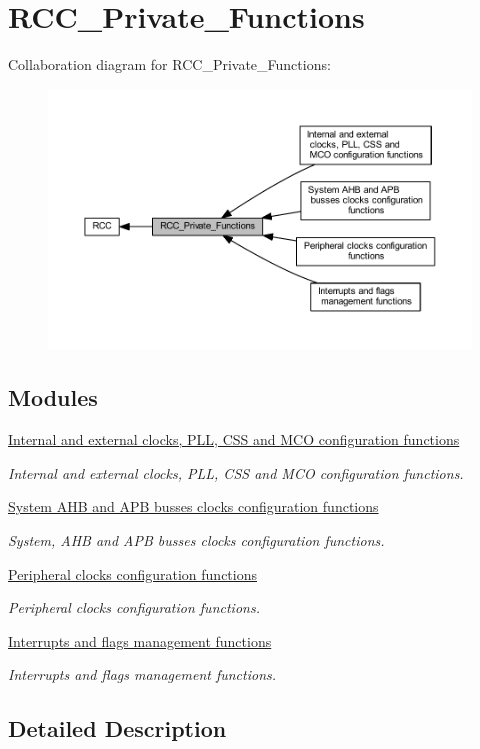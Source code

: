 \hypertarget{group___r_c_c___private___functions}{}\section{R\+C\+C\+\_\+\+Private\+\_\+\+Functions}
\label{group___r_c_c___private___functions}
Collaboration diagram for R\+C\+C\+\_\+\+Private\+\_\+\+Functions\+:
\nopagebreak
\begin{figure}[H]
\begin{center}
\leavevmode
\includegraphics[width=350pt]{group___r_c_c___private___functions}
\end{center}
\end{figure}
\subsection*{Modules}
\begin{DoxyCompactItemize}
\item 
\hyperlink{group___r_c_c___group1}{Internal and external clocks, P\+L\+L, C\+S\+S and M\+C\+O configuration functions}
\begin{DoxyCompactList}\small\item\em Internal and external clocks, P\+LL, C\+SS and M\+CO configuration functions. \end{DoxyCompactList}\item 
\hyperlink{group___r_c_c___group2}{System A\+H\+B and A\+P\+B busses clocks configuration functions}
\begin{DoxyCompactList}\small\item\em System, A\+HB and A\+PB busses clocks configuration functions. \end{DoxyCompactList}\item 
\hyperlink{group___r_c_c___group3}{Peripheral clocks configuration functions}
\begin{DoxyCompactList}\small\item\em Peripheral clocks configuration functions. \end{DoxyCompactList}\item 
\hyperlink{group___r_c_c___group4}{Interrupts and flags management functions}
\begin{DoxyCompactList}\small\item\em Interrupts and flags management functions. \end{DoxyCompactList}\end{DoxyCompactItemize}


\subsection{Detailed Description}
